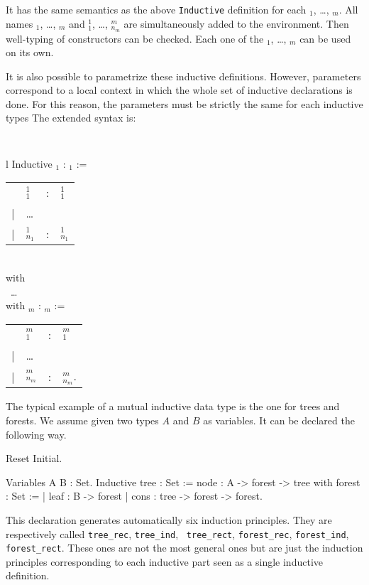 \noindent It has the same semantics as the above {\tt Inductive}
definition for each \ident$_1$, {\ldots}, \ident$_m$. All names
\ident$_1$, {\ldots}, \ident$_m$ and \ident$_1^1$, \dots,
\ident$_{n_m}^m$ are simultaneously added to the environment. Then
well-typing of constructors can be checked. Each one of the
\ident$_1$, {\ldots}, \ident$_m$ can be used on its own.

It is also possible to parametrize these inductive definitions.
However, parameters correspond to a local
context in which the whole set of inductive declarations is done.  For
this reason, the parameters must be strictly the same for each
inductive types The extended syntax is:

\medskip
{\tt 
\begin{tabular}{l}
Inductive {\ident$_1$} {\params} : {\type$_1$} :=  \\
\begin{tabular}{clcl}
   & {\ident$_1^1$}     &:& {\type$_1^1$} \\
 | & {\ldots} && \\
 | & {\ident$_{n_1}^1$} &:& {\type$_{n_1}^1$}
\end{tabular}  \\
with\\
~{\ldots} \\
with {\ident$_m$} {\params} : {\type$_m$} := \\
\begin{tabular}{clcl}
   & {\ident$_1^m$}     &:& {\type$_1^m$} \\
 | & {\ldots} \\
 | & {\ident$_{n_m}^m$} &:& {\type$_{n_m}^m$}.
\end{tabular}
\end{tabular}
}
\medskip

\Example
The typical example of a mutual inductive data type is the one for
trees and forests. We assume given two types $A$ and $B$ as variables.
It can be declared the following way.

\begin{coq_eval}
Reset Initial.
\end{coq_eval}
\begin{coq_example*}
Variables A B : Set.
Inductive tree : Set :=
    node : A -> forest -> tree
with forest : Set :=
  | leaf : B -> forest
  | cons : tree -> forest -> forest.
\end{coq_example*}

This declaration generates automatically six induction
principles. They are respectively 
called {\tt tree\_rec}, {\tt tree\_ind}, {\tt
  tree\_rect}, {\tt forest\_rec}, {\tt forest\_ind}, {\tt
  forest\_rect}.  These ones are not the most general ones but are
just the induction principles corresponding to each inductive part
seen as a single inductive definition.


